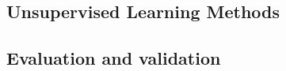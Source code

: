 \documentclass{article} %
\begin{document}
\subsection{Unsupervised Learning Methods}

\subsection{Evaluation and validation}
\end{document}
